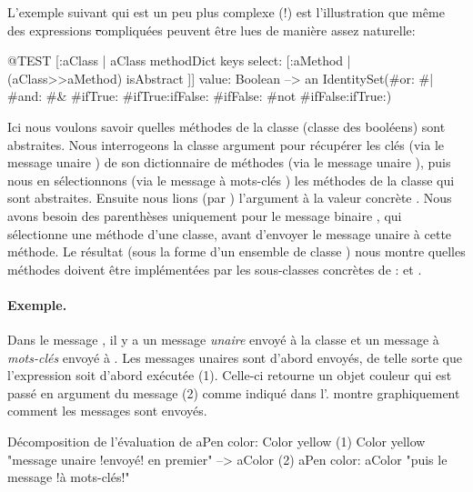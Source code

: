 \documentclass[a4paper,10pt,twoside]{book}
\begin{document}
L'exemple suivant qui est un peu plus complexe (!) est l'illustration que m\^eme des expressions \st compliqu\'ees peuvent \^etre lues de mani\`ere assez naturelle: 
\begin{code}{@TEST}
[:aClass | aClass methodDict keys select: [:aMethod | (aClass>>aMethod) isAbstract ]] value: Boolean --> an IdentitySet(#or: #| #and: #& #ifTrue: #ifTrue:ifFalse: #ifFalse: #not #ifFalse:ifTrue:)
\end{code}
\noindent
Ici nous voulons savoir quelles m\'ethodes de la classe 
(classe des bool\'eens) sont abstraites.
Nous interrogeons la classe argument  pour r\'ecup\'erer
les cl\'es (via le message unaire ) de son dictionnaire de
m\'ethodes (via le message unaire ), puis nous en
s\'electionnons (via le message \`a mots-cl\'es ) les
m\'ethodes de la classe qui sont abstraites.
Ensuite nous lions (par ) l'argument  \`a la
valeur concr\`ete .
Nous avons besoin des parenth\`eses uniquement pour le message binaire
\ct{>>}, qui s\'electionne une m\'ethode d'une classe, avant d'envoyer
le message unaire \mbox{} \`a cette m\'ethode. Le
r\'esultat (sous la forme d'un ensemble de classe )
nous montre quelles m\'ethodes doivent \^etre impl\'ement\'ees par les
sous-classes concr\`etes de :  et .


\paragraph{Exemple.}
Dans le message , il y a un message \emph{unaire}  envoy\'e \`a la classe  et un message \`a \emph{mots-cl\'es}  envoy\'e \`a . Les messages unaires sont d'abord envoy\'es, de telle sorte que l'expression  soit d'abord ex\'ecut\'ee (1). Celle-ci retourne un objet couleur qui est pass\'e en argument du message  (2) comme indiqu\'e dans l'.
 montre graphiquement comment les messages sont envoy\'es.

\begin{example}[decColor]{D\'ecomposition de l'\'evaluation de }{}
        aPen color: Color yellow
(1)                       Color yellow        "message unaire !envoy\'e! en premier"
                        --> aColor
(2)   aPen color: aColor                 "puis le message !\`a mots-cl\'es!"
\end{example}
\end{document}
